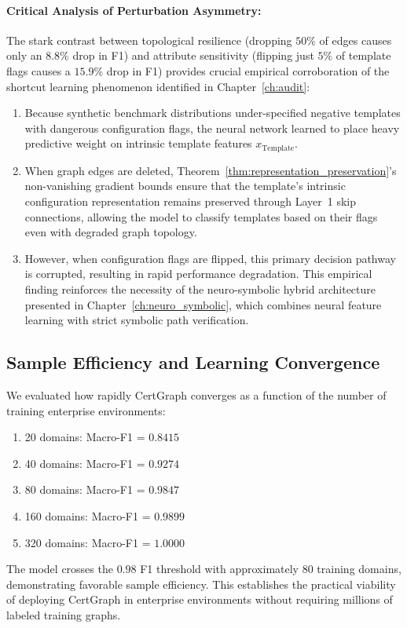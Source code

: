 \paragraph{Critical Analysis of Perturbation Asymmetry:}
The stark contrast between topological resilience (dropping $50\%$ of edges causes only an $8.8\%$ drop in F1) and attribute sensitivity (flipping just $5\%$ of template flags causes a $15.9\%$ drop in F1) provides crucial empirical corroboration of the shortcut learning phenomenon identified in Chapter~\ref{ch:audit}:
\begin{enumerate}
    \item Because synthetic benchmark distributions under-specified negative templates with dangerous configuration flags, the neural network learned to place heavy predictive weight on intrinsic template features $x_{\text{Template}}$.
    \item When graph edges are deleted, Theorem~\ref{thm:representation_preservation}'s non-vanishing gradient bounds ensure that the template's intrinsic configuration representation remains preserved through Layer~1 skip connections, allowing the model to classify templates based on their flags even with degraded graph topology.
    \item However, when configuration flags are flipped, this primary decision pathway is corrupted, resulting in rapid performance degradation. This empirical finding reinforces the necessity of the neuro-symbolic hybrid architecture presented in Chapter~\ref{ch:neuro_symbolic}, which combines neural feature learning with strict symbolic path verification.
\end{enumerate}

\subsection{Sample Efficiency and Learning Convergence}
We evaluated how rapidly CertGraph converges as a function of the number of training enterprise environments:
\begin{enumerate}
    \item 20 domains: Macro-F1 = $\mathbf{0.8415}$
    \item 40 domains: Macro-F1 = $\mathbf{0.9274}$
    \item 80 domains: Macro-F1 = $\mathbf{0.9847}$
    \item 160 domains: Macro-F1 = $\mathbf{0.9899}$
    \item 320 domains: Macro-F1 = $\mathbf{1.0000}$
\end{enumerate}
The model crosses the $0.98$ F1 threshold with approximately 80 training domains, demonstrating favorable sample efficiency. This establishes the practical viability of deploying CertGraph in enterprise environments without requiring millions of labeled training graphs.

